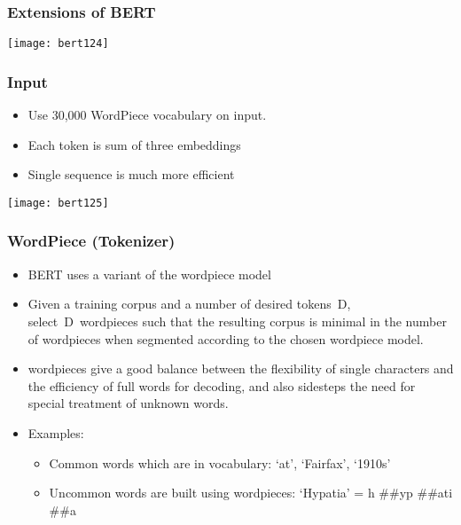\begin{frame}[fragile]\frametitle{Extensions of BERT}

			\begin{center}
			\texttt{[image: bert124]}
			\end{center}		
			

\end{frame}

\begin{frame}[fragile]\frametitle{Input}

		\begin{itemize}
		\item Use 30,000 WordPiece vocabulary on input. 
		\item Each token is sum of three embeddings 
		\item Single sequence is much more efficient
		\end{itemize}


			\begin{center}
			\texttt{[image: bert125]}
			\end{center}		
			

\end{frame}

\begin{frame}[fragile]\frametitle{WordPiece (Tokenizer)}

		\begin{itemize}
		\item BERT uses a variant of the wordpiece model
		\item Given a training corpus and a number of desired tokens D, select D wordpieces such that the resulting corpus is minimal in the number of wordpieces when segmented according to the chosen wordpiece model. 
		\item wordpieces give a good balance between the flexibility of single characters and the efficiency of full words for decoding, and also sidesteps the need for special treatment of unknown words.
		\item Examples:
				\begin{itemize}

		\item Common words which are in vocabulary: ‘at’, ‘Fairfax’, ‘1910s’
		\item Uncommon words are built using wordpieces: ‘Hypatia’ = h \#\#yp \#\#ati \#\#a
		\end{itemize}

		\end{itemize}

		

\end{frame}

